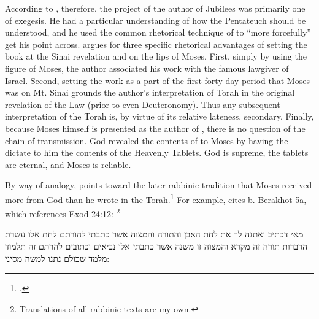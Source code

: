 According to \vanderkam, therefore, the project of the author of Jubilees was primarily one of exegesis. He had a particular understanding of how the Pentateuch should be understood, and he used the common rhetorical technique of \psy to ``more forcefully'' get his point across.%
    \autocite[28]{vanderkam_metso-etal2010}
\vanderkam argues for three specific rhetorical advantages of setting the book at the Sinai revelation and on the lips of Moses. First, simply by using the figure of Moses, the author associated his work with the famous lawgiver of Israel. Second, setting the work as a part of the first forty-day period that Moses was on Mt. Sinai grounds the author's interpretation of Torah in the original revelation of the Law (prior to even Deuteronomy). Thus any subsequent interpretation of the Torah is, by virtue of its relative lateness, secondary. Finally, because Moses himself is presented as the author of \jub, there is no question of the chain of transmission. God revealed the contents of \jub to Moses by having the \ap dictate to him the contents of the Heavenly Tablets. God is supreme, the tablets are eternal, and Moses is reliable.

By way of analogy, \vanderkam points toward the later rabbinic tradition that Moses received more from God than he wrote in the Torah.\footnote{\cite[28--31]{vanderkam_metso-etal2010}.} For example, \vanderkam cites b. Berakhot 5a, which references Exod 24:12:%
    \footnote{Translations of all rabbinic texts are my own.}

\begin{aramaictranslation}
    מאי דכתיב ואתנה לך את לחת האבן והתורה והמצוה אשר כתבתי להורתם לחת אלו עשרת הדברות תורה זה מקרא והמצוה זו משנה אשר כתבתי אלו נביאים וכתובים להרתם זה תלמוד מלמד שכולם נתנו למשה מסיני: 
\end{aramaictranslation}

